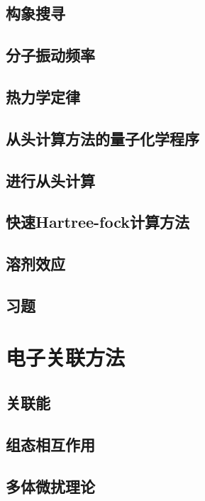 \documentclass{book}
\begin{document}
	\section{构象搜寻}
	
	\section{分子振动频率}
	
	\section{热力学定律}
	
	\section{从头计算方法的量子化学程序}
	
	\section{进行从头计算}
	
	\section{快速Hartree-fock计算方法}
	
	\section{溶剂效应}
	
	\section*{习题}
	
	\chapter{电子关联方法}
	\section{关联能}
	
	\section{组态相互作用}
	
	\section{多体微扰理论}
	
\end{document}
